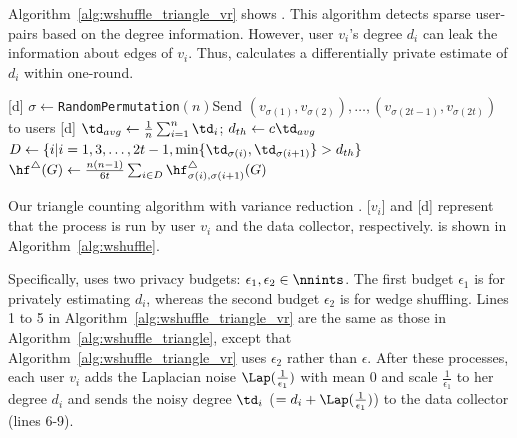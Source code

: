 Algorithm~\ref{alg:wshuffle_triangle_vr} shows \AlgWSTriVR{}. 
This algorithm detects sparse user-pairs based on the degree information. 
However, user $v_i$'s degree $d_i$ can leak the information about edges of $v_i$. 
Thus, \AlgWSTriVR{} calculates a differentially private estimate of $d_i$ within one-round. 

\setlength{\algomargin}{5mm}
\begin{algorithm}[t]
  \SetAlgoLined
  [d] $\sigma \leftarrow$\texttt{RandomPermutation}$(n)$\;
  [d] Send $(v_{\sigma(1)}, v_{\sigma(2)}), \ldots, (v_{\sigma(2t-1)}, v_{\sigma(2t)})$ to users\;
  [d] $\td_{avg} \leftarrow \frac{1}{n} \sum_{i=1}^n \td_i$; $d_{th} \leftarrow c \td_{avg}$\;
  [d] $D \leftarrow \{i | i = 1, 3, \ldots, 2t-1, 
  \min\{\td_{\sigma(i)}, \td_{\sigma(i+1)}\} > d_{th}\}$\;
  [d] $\hf^\triangle(G) \leftarrow \frac{n(n-1)}{6t} \sum_{i \in D} \hf_{\sigma(i),\sigma(i+1)}^\triangle(G)$\;
  \caption{Our triangle counting algorithm with variance reduction \AlgWSTriVR{}.
  [$v_i$] and [d] represent that the process is run by user $v_i$ and the data collector, respectively. 
  \AlgWS{} is shown in Algorithm~\ref{alg:wshuffle}. 
  }\label{alg:wshuffle_triangle_vr}
\end{algorithm}

Specifically, \AlgWSTriVR{} uses two privacy budgets: $\epsilon_1, \epsilon_2 \in \nnints$. 
The first budget $\epsilon_1$ is for privately estimating $d_i$, whereas the second budget $\epsilon_2$ is for wedge shuffling. 
Lines 1 to 5 in Algorithm~\ref{alg:wshuffle_triangle_vr} are the same as those in Algorithm~\ref{alg:wshuffle_triangle}, except that Algorithm~\ref{alg:wshuffle_triangle_vr} uses $\epsilon_2$ rather than $\epsilon$. 
After these processes, each user $v_i$ adds the Laplacian noise $\Lap(\frac{1}{\epsilon_1})$ with mean $0$ and scale $\frac{1}{\epsilon_1}$ to her degree $d_i$ and sends the noisy degree $\td_i$ ($= d_i + \Lap(\frac{1}{\epsilon_1})$) to the data collector (lines 6-9). 

